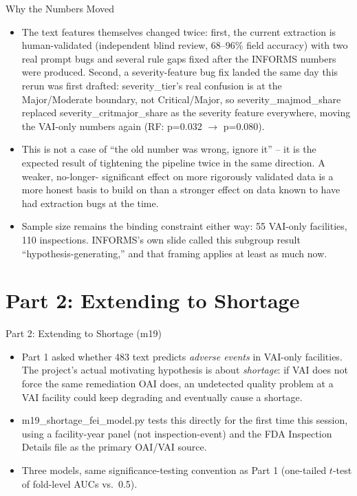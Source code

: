 \documentclass[aspectratio=169,10pt]{beamer}
\begin{document}
\begin{frame}{Why the Numbers Moved}
\begin{itemize}
  \setlength{\itemsep}{10pt}
  \item The text features themselves changed twice: first, the current extraction is
        human-validated (independent blind review, 68--96\% field accuracy) with two real prompt
        bugs and several rule gaps fixed after the INFORMS numbers were produced. Second, a
        severity-feature bug fix landed the same day this rerun was first drafted:
        severity\_tier's real confusion is at the Major/Moderate boundary, not Critical/Major, so
        severity\_majmod\_share replaced severity\_critmajor\_share as the severity feature
        everywhere, moving the VAI-only numbers again (RF: p=0.032 $\to$ p=0.080).
  \item This is not a case of ``the old number was wrong, ignore it'' -- it is the expected
        result of tightening the pipeline twice in the same direction. A weaker, no-longer-
        significant effect on more rigorously validated data is a more honest basis to build on
        than a stronger effect on data known to have had extraction bugs at the time.
  \item Sample size remains the binding constraint either way: 55 VAI-only facilities, 110
        inspections. INFORMS's own slide called this subgroup result ``hypothesis-generating,''
        and that framing applies at least as much now.
\end{itemize}
\end{frame}

\section{Part 2: Extending to Shortage}

\begin{frame}{Part 2: Extending to Shortage (m19)}
\begin{itemize}
  \setlength{\itemsep}{10pt}
  \item Part 1 asked whether 483 text predicts \emph{adverse events} in VAI-only facilities.
        The project's actual motivating hypothesis is about \emph{shortage}: if VAI does not
        force the same remediation OAI does, an undetected quality problem at a VAI facility
        could keep degrading and eventually cause a shortage.
  \item m19\_shortage\_fei\_model.py tests this directly for the first time this session,
        using a facility-year panel (not inspection-event) and the FDA Inspection Details file
        as the primary OAI/VAI source.
  \item Three models, same significance-testing convention as Part 1 (one-tailed $t$-test of
        fold-level AUCs vs.\ 0.5).
\end{itemize}
\end{frame}
\end{document}
